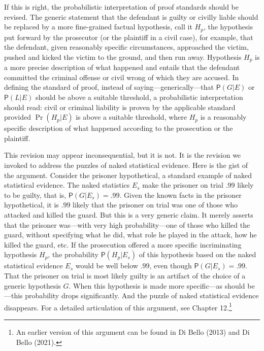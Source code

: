 \documentclass[
  10pt,
  dvipsnames,enabledeprecatedfontcommands]{scrartcl}
\newcommand{\pr}[1]{\ensuremath{\mathsf{P}(#1)}}
\begin{document}
If this is right, the probabilistic interpretation of proof standards
should be revised. The generic statement that the defendant is guilty or
civilly liable should be replaced by a more fine-grained factual
hypothesis, call it \(H_p\), the hypothesis put forward by the
prosecutor (or the plaintiff in a civil case), for example, that the
defendant, given reasonably specific circumstances, approached the
victim, pushed and kicked the victim to the ground, and then run away.
Hypothesis \(H_p\) is a more precise description of what happened and
entails that the defendant committed the criminal offense or civil wrong
of which they are accused. In defining the standard of proof, instead of
saying---generically---that \(\pr{G \vert E}\) or \(\pr{L \vert E}\)
should be above a suitable threshold, a probabilistic interpretation
should read: civil or criminal liability is proven by the applicable
standard provided \(\Pr(H_p \vert E)\) is above a suitable threshold,
where \(H_p\) is a reasonably specific description of what happened
according to the prosecution or the plaintiff.

This revision may appear inconsequential, but it is not. It is the
revision we invoked to address the puzzles of naked statistical
evidence. Here is the gist of the argument. Consider the prisoner
hypothetical, a standard example of naked statistical evidence. The
naked statistics \(E_s\) make the prisoner on trial .99 likely to be
guilty, that is, \(\pr{G \vert E_s} =.99\). Given the known facts in the
prisoner hypothetical, it is \(.99\) likely that the prisoner on trial
was one of those who attacked and killed the guard. But this is a very
generic claim. It merely asserts that the prisoner was---with very high
probability---one of those who killed the guard, without specifying what
he did, what role he played in the attack, how he killed the guard, etc.
If the prosecution offered a more specific incriminating hypothesis
\(H_p\), the probability \(\pr{H_p \vert E_{s}}\) of this hypothesis
based on the naked statistical evidence \(E_s\) would be well below
\(.99\), even though \(\pr{G \vert E_s}=.99\). That the prisoner on
trial is most likely guilty is an artifact of the choice of a generic
hypothesis \(G\). When this hypothesis is made more specific---as should
be---this probability drops significantly. And the puzzle of naked
statistical evidence disappears. For a detailed articulation of this
argument, see Chapter 12.\footnote{An earlier version of this argument
  can be found in Di Bello (2013) and Di Bello (2021).}
\end{document}
